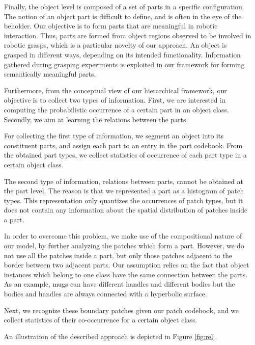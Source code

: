 \documentclass[a4paper,11pt,pdf]{../templates/pacmanreport}
\begin{document}
Finally, the object level is composed of a set of parts in a specific
configuration. The notion of an object part is difficult to define,
and is often in the eye of the beholder.  Our objective is to form
parts that are meaningful in robotic interaction.  Thus, parts are
formed from object regions observed to be involved in robotic grasps,
which is a particular novelty of our approach. An object is grasped in
different ways, depending on its intended functionality.  Information
gathered during grasping experiments is exploited in our framework for
forming semantically meaningful parts.

Furthermore, from the conceptual view of our hierarchical framework, our objective is to collect two types of information. First, we are interested in computing the probabilistic occurrence of a certain part in an object class. Secondly, we aim at learning the relations between the parts.

For collecting the first type of information, we segment an object
into its constituent parts, and assign each part to an entry in the
part codebook. From the obtained part types, we collect statistics of
occurrence of each part type in a certain object class.

The second type of information, relations between parts, cannot be
obtained at the part level. The reason is that we represented a part
as a histogram of patch types. This representation only quantizes the
occurrences of patch types, but it does not contain any information
about the spatial distribution of patches inside a part.

In order to overcome this problem, we make use of the compositional
nature of our model, by further analyzing the patches which form a
part. However, we do not use all the patches inside a part, but only
those patches adjacent to the border between two adjacent parts. Our
assumption relies on the fact that object instances which belong to
one class have the same connection between the parts. As an example,
mugs can have different handles and different bodies but the bodies
and handles are always connected with a hyperbolic surface.

Next, we recognize these boundary patches given our patch codebook,
and we collect statistics of their co-occurrence for a certain object
class.

An illustration of the described approach is depicted in Figure \ref{fig:rel}.
\end{document}

